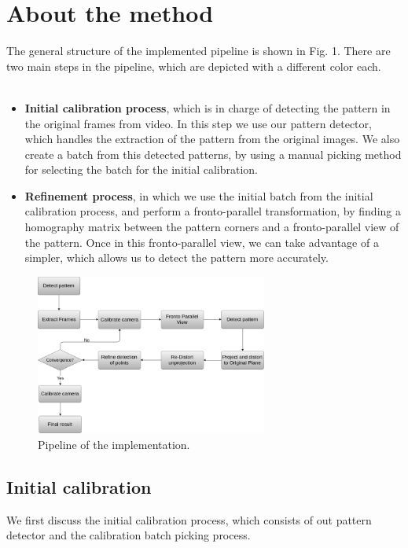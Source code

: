 \documentclass[journal]{IEEEtran}
\begin{document}
\section{About the method}
The general structure of the implemented pipeline is shown in Fig. 1. There are two main steps in the pipeline, which are depicted with a different color each. 
\\
\\
\begin{itemize}
  \item \textbf{Initial calibration process}, which is in charge of detecting the pattern in the original frames from video. In this step we use our pattern detector, which handles the extraction of the pattern from the original images. We also create a batch from this detected patterns, by using a manual picking method for selecting the batch for the initial calibration.
  \item \textbf{Refinement process}, in which we use the initial batch from the initial calibration process, and perform a fronto-parallel transformation, by finding a homography matrix between the pattern corners and a fronto-parallel view of the pattern. Once in this fronto-parallel view, we can take advantage of a simpler, which allows us to detect the pattern more accurately.
\end{itemize}

\begin{figure}[H]
\centering
\includegraphics[width=3.0in]{_img/img_report4_pipeline.png}
\caption{Pipeline of the implementation.}
\end{figure}

\subsection{ \textbf{ Initial calibration } }

We first discuss the initial calibration process, which consists of out pattern detector and the calibration batch picking process.
\end{document}
